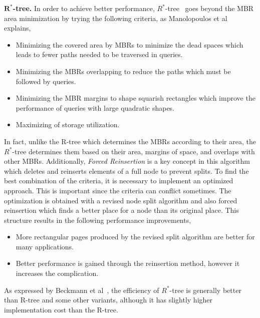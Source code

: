 \documentclass[a4paper,12pt]{article}
\begin{document}
\textbf{$\boldsymbol{R^*}$-tree.}
In order to achieve better performance, $R^*$-tree~\cite{rstartree} goes beyond the MBR area minimization by trying the following criteria, as Manolopoulos et al~\cite{Manolopoulos:2005} explains,
\begin{itemize}
\item Minimizing the covered area by MBRs to minimize the dead spaces which leads to fewer paths needed to be traversed in queries. 
\item Minimizing the MBRs overlapping to reduce the paths which must be followed by queries.
\item Minimizing the MBR margins to shape squarish rectangles which improve the performance of queries with large quadratic shapes.
\item Maximizing of storage utilization. 
\end{itemize}
In fact, unlike the R-tree which determines the MBRs according to their area, the $R^*$-tree determines them based on their area, margins of space, and overlaps with other MBRs. Additionally, \textit{Forced Reinsertion} is a key concept in this algorithm which deletes and reinserts elements of a full node to prevent splits.
To find the best combination of the criteria, it is necessary to implement an optimized approach. This is important since the criteria can conflict sometimes. The optimization is obtained with a revised node split algorithm and also forced reinsertion which finds a better place for a node than its original place. This structure results in the following performance improvements,
\begin{itemize}
\item More rectangular pages produced by the revised split algorithm are better for many applications.
\item Better performance is gained through the reinsertion method, however it increases the complication.
\end{itemize}
As expressed by Beckmann et al~\cite{rstartree}, the efficiency of $R^*$-tree is generally better than R-tree and some other variants, although it has slightly higher implementation cost than the R-tree.
\end{document}
